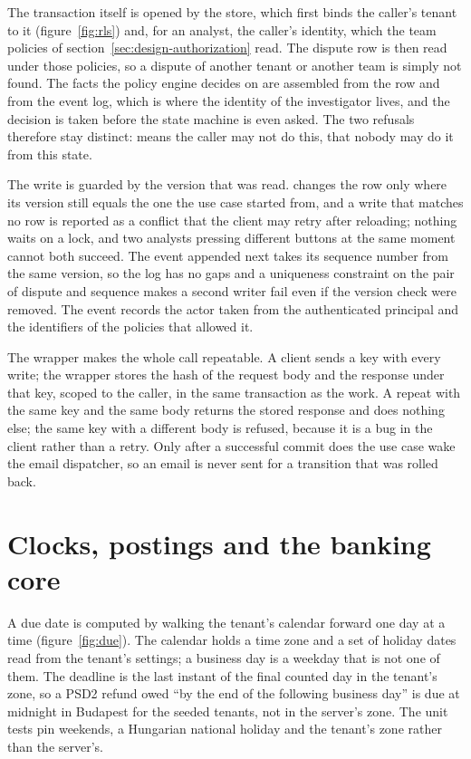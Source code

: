 The transaction itself is opened by the store, which first binds the caller's tenant to it
(figure~\ref{fig:rls}) and, for an analyst, the caller's identity, which the team policies of
section~\ref{sec:design-authorization} read. The dispute row is then read under those policies, so a dispute of
another tenant or another team is simply not found. The facts the policy engine decides on are assembled from the
row and from the event log, which is where the identity of the investigator lives, and the decision is taken
before the state machine is even asked. The two refusals therefore stay distinct:  means the caller may not
do this,  that nobody may do it from this state.

The write is guarded by the version that was read.  changes the row only where its version
still equals the one the use case started from, and a write that matches no row is reported as a conflict that the
client may retry after reloading; nothing waits on a lock, and two analysts pressing different buttons at the same
moment cannot both succeed. The event appended next takes its sequence number from the same version, so the log has
no gaps and a uniqueness constraint on the pair of dispute and sequence makes a second writer fail even if the
version check were removed. The event records the actor taken from the authenticated principal and the
identifiers of the policies that allowed it.

The wrapper  makes the whole call repeatable. A client sends a key with every write; the wrapper
stores the hash of the request body and the response under that key, scoped to the caller, in the same
transaction as the work. A repeat with the same key and the same body returns the stored response and does nothing
else; the same key with a different body is refused, because it is a bug in the client rather than a retry. Only
after a successful commit does the use case wake the email dispatcher, so an email is never sent for a transition
that was rolled back.

\section{Clocks, postings and the banking core}
\label{sec:impl-money}

A due date is computed by walking the tenant's calendar forward one day at a time (figure~\ref{fig:due}). The
calendar holds a time zone and a set of holiday dates read from the tenant's settings; a business day is a weekday
that is not one of them. The deadline is the last instant of the final counted day in the tenant's zone, so a PSD2
refund owed ``by the end of the following business day'' is due at midnight in Budapest for the seeded tenants, not in the server's zone.
The unit tests pin weekends, a Hungarian national holiday and the tenant's zone rather than the server's.

